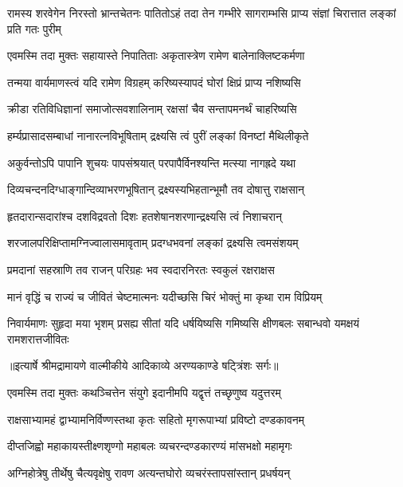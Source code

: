 \threelineshloka
{रामस्य शरवेगेन निरस्तो भ्रान्तचेतनः}
{पातितोऽहं तदा तेन गम्भीरे सागराम्भसि}
{प्राप्य संज्ञां चिरात्तात लङ्कां प्रति गतः पुरीम्} %

\twolineshloka
{एवमस्मि तदा मुक्तः सहायास्ते निपातिताः}
{अकृतास्त्रेण रामेण बालेनाक्लिष्टकर्मणा} %

\twolineshloka
{तन्मया वार्यमाणस्त्वं यदि रामेण विग्रहम्}
{करिष्यस्यापदं घोरां क्षिप्रं प्राप्य नशिष्यसि} %

\twolineshloka
{क्रीडा रतिविधिज्ञानां समाजोत्सवशालिनाम्}
{रक्षसां चैव सन्तापमनर्थं चाहरिष्यसि} %

\twolineshloka
{हर्म्यप्रासादसम्बाधां नानारत्नविभूषिताम्}
{द्रक्ष्यसि त्वं पुरीं लङ्कां विनष्टां मैथिलीकृते} %

\twolineshloka
{अकुर्वन्तोऽपि पापानि शुचयः पापसंश्रयात्}
{परपापैर्विनश्यन्ति मत्स्या नागह्रदे यथा} %

\twolineshloka
{दिव्यचन्दनदिग्धाङ्गान्दिव्याभरणभूषितान्}
{द्रक्ष्यस्यभिहतान्भूमौ तव दोषात्तु राक्षसान्} %

\twolineshloka
{हृतदारान्सदारांश्च दशविद्रवतो दिशः}
{हतशेषानशरणान्द्रक्ष्यसि त्वं निशाचरान्} %

\twolineshloka
{शरजालपरिक्षिप्तामग्निज्वालासमावृताम्}
{प्रदग्धभवनां लङ्कां द्रक्ष्यसि त्वमसंशयम्} %

\twolineshloka
{प्रमदानां सहस्राणि तव राजन् परिग्रहः}
{भव स्वदारनिरतः स्वकुलं रक्षराक्षस} %

\twolineshloka
{मानं वृद्धिं च राज्यं च जीवितं चेष्टमात्मनः}
{यदीच्छसि चिरं भोक्तुं मा कृथा राम विप्रियम्} %

\fourlineindentedshloka
{निवार्यमाणः सुहृदा मया भृशम्}
{प्रसह्य सीतां यदि धर्षयिष्यसि}
{गमिष्यसि क्षीणबलः सबान्धवो}
{यमक्षयं रामशरात्तजीवितः} %


{॥इत्यार्षे श्रीमद्रामायणे वाल्मीकीये आदिकाव्ये अरण्यकाण्डे षट्त्रिंशः सर्गः॥}


\twolineshloka
{एवमस्मि तदा मुक्तः कथञ्चित्तेन संयुगे}
{इदानीमपि यद्वृत्तं तच्छृणुष्व यदुत्तरम्} %

\twolineshloka
{राक्षसाभ्यामहं द्वाभ्यामनिर्विण्णस्तथा कृतः}
{सहितो मृगरूपाभ्यां प्रविष्टो दण्डकावनम्} %

\twolineshloka
{दीप्तजिह्वो महाकायस्तीक्ष्णशृण्गो महाबलः}
{व्यचरन्दण्डकारण्यं मांसभक्षो महामृगः} %

\twolineshloka
{अग्निहोत्रेषु तीर्थेषु चैत्यवृक्षेषु रावण}
{अत्यन्तघोरो व्यचरंस्तापसांस्तान् प्रधर्षयन्} %

